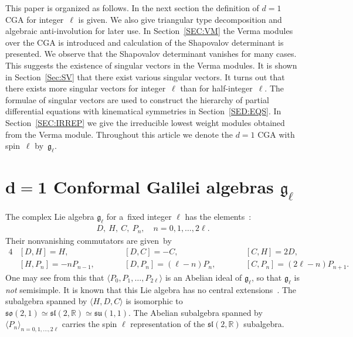 \documentclass[pdftex]{sigma}
\numberwithin{equation}{section}
\begin{document}
This paper is organized as follows.
In the next section the def\/inition of $d = 1$ CGA for integer~$\ell$ is given.
We also give triangular type decomposition and algebraic anti-involution for later use.
In Section~\ref{SEC:VM} the Verma modules over the CGA is introduced and calculation of the Shapovalov determinant is
presented.
We observe that the Shapovalov determinant vanishes for many cases.
This suggests the existence of singular vectors in the Verma modules.
It is shown in Section~\ref{Sec:SV} that there exist various singular vectors.
It turns out that there exists more singular vectors for integer~$\ell$ than for half-integer~$\ell$.
The formulae of singular vectors are used to construct the hierarchy of partial dif\/ferential equations with kinematical
symmetries in Section~\ref{SED:EQS}.
In Section~\ref{SEC:IRREP} we give the irreducible lowest weight modules obtained from the Verma module.
Throughout this article we denote the $ d= 1 $ CGA with spin~$\ell$ by~$ {\mathfrak g}_{\ell}$.

\section[$d=1$ Conformal Galilei algebras ${\mathfrak g}_{\ell}$]{$\boldsymbol{d=1}$ Conformal Galilei algebras $\boldsymbol{{\mathfrak g}_{\ell}}$}

The complex Lie algebra $ {\mathfrak g}_{\ell} $ for a~f\/ixed integer $ \ell $ has the elements~\cite{NdORM1}:
\begin{gather*}
D, \ H, \ C, \ P_n, \quad n = 0, 1,   \dots,   2\ell.
\end{gather*}
Their nonvanishing commutators are given~by
\begin{alignat}{4}
& [D, H] = H, \qquad & & [D, C] = - C, \qquad & & [C, H] = 2D,& \nonumber\\
& [H, P_n] = -n P_{n-1}, \qquad & & [D, P_n] = (\ell-n) P_n, \qquad & & [C, P_n] = (2\ell-n) P_{n+1}.&\label{nonvanishing-commutators}
\end{alignat}
One may see from this that $ \langle   P_0, P_1, \dots, P_{2\ell}   \rangle $ is an Abelian ideal of $ {\mathfrak
g}_{\ell} $, so that $ {\mathfrak g}_{\ell} $ is \textit{not} semisimple.
It is known that this Lie algebra has no central extensions~\cite{MT}.
The subalgebra spanned by $ \langle
 H, D, C
\rangle $ is isomorphic to $ {\mathfrak{so}}(2,1) \simeq {\mathfrak{sl}}(2,{\mathbb R}) \simeq {\mathfrak{su}}(1,1)$.
The Abelian subalgebra spanned by $ \langle
P_n
\rangle_{n=0, 1, \dots, 2\ell} $ carries the spin $ \ell $ representation of the $ {\mathfrak{sl}}(2,{\mathbb R})$
subalgebra.
\end{document}
